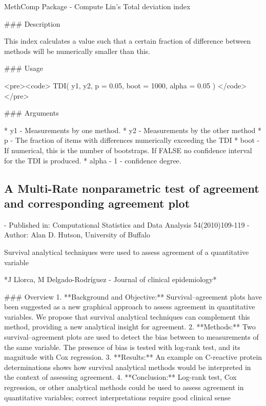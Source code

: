\newpage
MethComp Package - Compute Lin's Total deviation index

### Description

This index calculates a value such that a certain fraction of difference between methods will be numerically smaller than this.

### Usage

<pre><code>
TDI( y1, y2, p = 0.05, boot = 1000, alpha = 0.05 )
</code></pre>

### Arguments

* y1	- Measurements by one method.
* y2	- Measurements by the other method
* p	- The fraction of items with differences numerically exceeding the TDI
* boot	- If numerical, this is the number of bootstraps. If FALSE no confidence interval for the TDI is produced.
* alpha	 - 1 - confidence degree.




\newpage
\subsection*{ A Multi-Rate nonparametric test of agreement and corresponding agreement plot}

- Published in: Computational Statistics and Data Analysis 54(2010)109-119
- Author: Alan D. Hutson, University of Buffalo

Survival analytical techniques were used to assess agreement of a quantitative variable

*J Llorca, M Delgado-Rodríguez - Journal of clinical epidemiology*

### Overview
1. **Background and Objective:** Survival–agreement plots have been suggested as a new graphical approach to assess agreement in
quantitative variables. We propose that survival analytical techniques can complement this method, providing a new analytical insight
for agreement.
2. **Methods:** Two survival–agreement plots are used to detect the bias between to measurements of the same variable. The presence of
bias is tested with log-rank test, and its magnitude with Cox regression.
3. **Results:** An example on C-reactive protein determinations shows how survival analytical methods would be interpreted in the context
of assessing agreement.
4. **Conclusion:** Log-rank test, Cox regression, or other analytical methods could be used to assess agreement in quantitative variables;
correct interpretations require good clinical sense

